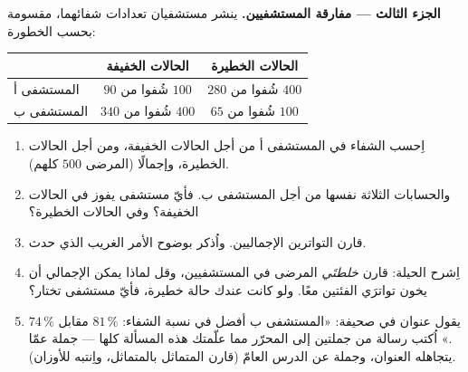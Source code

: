 \begin{problem}
\medskip
\noindent\textbf{الجزء الثالث --- مفارقة
المستشفيين.}
ينشر مستشفيان تعدادات شفائهما، مقسومة بحسب الخطورة:
\begin{center}
\renewcommand{\arraystretch}{1.3}
\begin{tabular}{l|cc}
 & الحالات الخفيفة & الحالات الخطيرة \\
\hline
المستشفى أ & $90$ شُفوا من $100$ & $280$ شُفوا من $400$ \\
المستشفى ب & $340$ شُفوا من $400$ & $65$ شُفوا من $100$ \\
\end{tabular}
\end{center}
\begin{enumerate}[resume]
  \item اِحسب  الشفاء في المستشفى أ من أجل الحالات الخفيفة، ومن أجل
        الحالات الخطيرة، وإجمالًا (المرضى $500$ كلهم).
  \item والحسابات الثلاثة نفسها من أجل المستشفى ب. فأيّ مستشفى
        يفوز في الحالات الخفيفة؟ وفي الحالات الخطيرة؟
  \item قارن التواترين الإجماليين. واُذكر بوضوح
        الأمر الغريب الذي حدث.
  \item اِشرح الحيلة: قارن \emph{خلطتَي} المرضى
        في المستشفيين، وقل لماذا يمكن 
        الإجمالي أن يخون تواترَي الفئتين معًا. ولو كانت
        عندك حالة خطيرة، فأيّ مستشفى تختار؟
  \item يقول عنوان في صحيفة: «المستشفى ب أفضل في
        نسبة الشفاء: $81\,\%$ مقابل $74\,\%$.» اُكتب
        رسالة من جملتين إلى المحرّر مما علّمتك
        هذه المسألة كلها --- جملة عمّا
        يتجاهله العنوان، وجملة عن الدرس العامّ
        (قارن المتماثل بالمتماثل، واِنتبه للأوزان).
\end{enumerate}
\end{problem}
